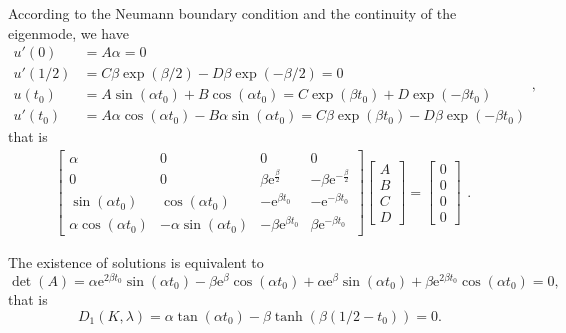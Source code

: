 \documentclass[a4paper,11pt]{article}
\begin{document}
\begin{appendices}
According to the Neumann boundary condition and the continuity of the eigenmode, we have
\begin{equation*}
\begin{split}
u'(0) & = A \alpha = 0 \\
u'(1/2) & = C \beta \exp(\beta/2) - D \beta \exp(-\beta/2) = 0 \\
u(t_0) & = A \sin(\alpha t_0) + B \cos(\alpha t_0) = C \exp(\beta t_0) + D \exp(-\beta t_0) \\
u'(t_0) & = A \alpha \cos(\alpha t_0) - B \alpha \sin(\alpha t_0) = C \beta \exp(\beta t_0) - D \beta \exp(-\beta t_0)
\end{split},
\end{equation*}
that is
\begin{equation*}
\begin{split}
\left[\begin{array}{cccc} \alpha & 0 & 0 & 0\\ 0 & 0 & \beta \mathrm{e}^{\frac{\beta}{2}} & - \beta \mathrm{e}^{-\frac{\beta}{2}}\\ \sin\!\left(\alpha t_0\right) & \cos\!\left(\alpha t_0\right) & - \mathrm{e}^{\beta t_0} & - \mathrm{e}^{- \beta t_0}\\ \alpha \cos\!\left(\alpha t_0\right) & - \alpha \sin\!\left(\alpha t_0\right) & - \beta \mathrm{e}^{\beta t_0} & \beta \mathrm{e}^{- \beta t_0} \end{array}\right]
\left[\begin{array}{c} A \\ B \\ C \\ D \end{array}\right]
=
\left[\begin{array}{c} 0 \\ 0 \\ 0 \\ 0 \end{array}\right]
\end{split}.
\end{equation*}

The existence of solutions is equivalent to
\begin{equation*}
\det(A) = \alpha \mathrm{e}^{2 \beta t_0} \sin\!\left(\alpha t_0\right) - \beta \mathrm{e}^{\beta} \cos\!\left(\alpha t_0\right) + \alpha \mathrm{e}^{\beta} \sin\!\left(\alpha t_0\right) + \beta \mathrm{e}^{2 \beta t_0} \cos\!\left(\alpha t_0\right) = 0,
\end{equation*}
that is
\begin{equation*}
D_1(K, \lambda) = \alpha \tan(\alpha t_0) - \beta \tanh(\beta (1/2 - t_0)) = 0.
\end{equation*}


\end{appendices}
\end{document}
